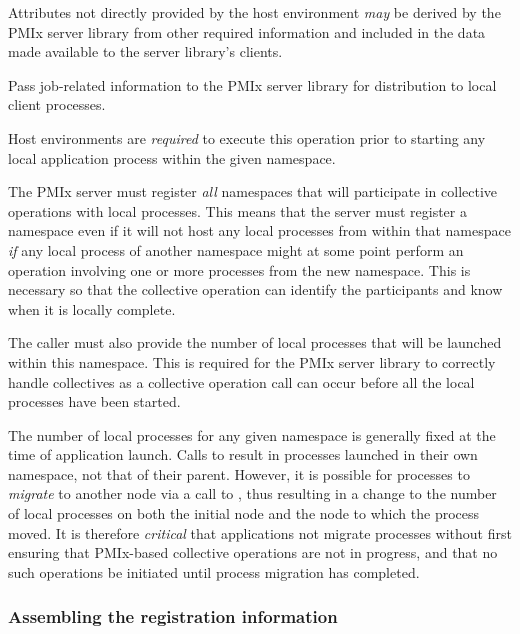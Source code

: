 Attributes not directly provided by the host environment \textit{may} be derived by the \ac{PMIx} server library from other required information and included in the data made available to the server library's clients.

\optattrend

\descr

Pass job-related information to the \ac{PMIx} server library for distribution to local client processes.

\advicermstart
Host environments are \textit{required} to execute this operation prior to starting any local application process within the given namespace.

The \ac{PMIx} server must register \emph{all} namespaces that will participate in collective operations with local processes.
This means that the server must register a namespace even if it will not host any local processes from within that namespace \emph{if} any local process of another namespace might at some point perform an operation involving one or more processes from the new namespace.
This is necessary so that the collective operation can identify the participants and know when it is locally complete.

The caller must also provide the number of local processes that will be launched within this namespace.
This is required for the \ac{PMIx} server library to correctly handle collectives as a collective operation call can occur before all the local processes have been started.
\advicermend

\adviceuserstart
The number of local processes for any given namespace is generally fixed at the time of application launch. Calls to  result in processes launched in their own namespace, not that of their parent. However, it is possible for processes to \textit{migrate} to another node via a call to , thus resulting in a change to the number of local processes on both the initial node and the node to which the process moved. It is therefore \textit{critical} that applications not migrate processes without first ensuring that \ac{PMIx}-based collective operations are not in progress, and that no such operations be initiated until process migration has completed.
\adviceuserend

\subsubsection{Assembling the registration information}
\label{chap:api_server:assemble}

